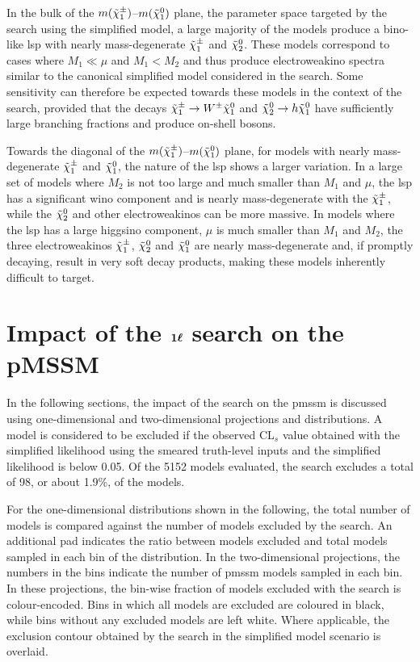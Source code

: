 In the bulk of the $m(\tilde{\chi}_1^\pm)$--$m(\tilde{\chi}_1^0)$ plane, \ie the parameter space targeted by the \onelepton search using the simplified model, a large majority of the models produce a bino-like \gls{lsp} with nearly mass-degenerate $\tilde{\chi}_1^\pm$ and $\tilde{\chi}_2^0$. These models correspond to cases where $M_1 \ll \mu$ and $M_1 < M_2$ and thus produce electroweakino spectra similar to the canonical simplified model considered in the \onelepton search. Some sensitivity can therefore be expected towards these models in the context of the \onelepton search, provided that the decays $\tilde{\chi}_1^\pm \rightarrow W^\pm \tilde{\chi}_1^0$ and $\tilde{\chi}_2^0 \rightarrow h \tilde{\chi}_1^0$ have sufficiently large branching fractions and produce on-shell bosons.

Towards the diagonal of the $m(\tilde{\chi}_1^\pm)$--$m(\tilde{\chi}_1^0)$ plane, \ie for models with nearly mass-degenerate $\tilde{\chi}_1^\pm$ and $\tilde{\chi}_1^0$, the nature of the \gls{lsp} shows a larger variation.
In a large set of models where $M_2$ is not too large and much smaller than $M_1$ and $\mu$, the \gls{lsp} has a significant wino component and is nearly mass-degenerate with the $\tilde{\chi}_1^\pm$, while the $\tilde{\chi}_2^0$ and other electroweakinos can be more massive.
In models where the \gls{lsp} has a large higgsino component, \ie $\mu$ is much smaller than $M_1$ and $M_2$, the three electroweakinos $\tilde{\chi}_1^\pm$, $\tilde{\chi}_2^0$ and $\tilde{\chi}_1^0$ are nearly mass-degenerate and, if promptly decaying, result in very soft decay products, making these models inherently difficult to target.

\section[Impact of the $1\ell$ search on the pMSSM]{Impact of the $\makemebold{1\ell}$ search on the pMSSM}

In the following sections, the impact of the \onelepton search on the \gls{pmssm} is discussed using one-dimensional and two-dimensional projections and distributions.
A model is considered to be excluded if the observed CL$_s$ value obtained with the simplified likelihood using the smeared truth-level inputs and the simplified likelihood is below 0.05.
Of the 5152 models evaluated, the \onelepton search excludes a total of 98, or about 1.9\%, of the models.

For the one-dimensional distributions shown in the following, the total number of models is compared against the number of models excluded by the \onelepton search.
An additional pad indicates the ratio between models excluded and total models sampled in each bin of the distribution.
In the two-dimensional projections, the numbers in the bins indicate the number of \gls{pmssm} models sampled in each bin.
In these projections, the bin-wise fraction of models excluded with the \onelepton search is colour-encoded.
Bins in which all models are excluded are coloured in black, while bins without any excluded models are left white.
Where applicable, the exclusion contour obtained by the \onelepton search in the simplified model scenario is overlaid.

